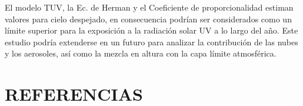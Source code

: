 \documentclass[10pt,twocolumn]{article}
\begin{document}
El modelo TUV, la Ec. de Herman y el Coeficiente de proporcionalidad estiman valores para cielo despejado, en consecuencia podrían ser considerados como un límite superior para la exposición a la radiación solar UV a lo largo del año. Este estudio podría extenderse en un futuro para analizar la contribución de las nubes y los aerosoles,\cite{Kim2020} así como la mezcla en altura con la capa límite atmosférica.
\section{REFERENCIAS}
\renewcommand{\refname}{}

\end{document}
